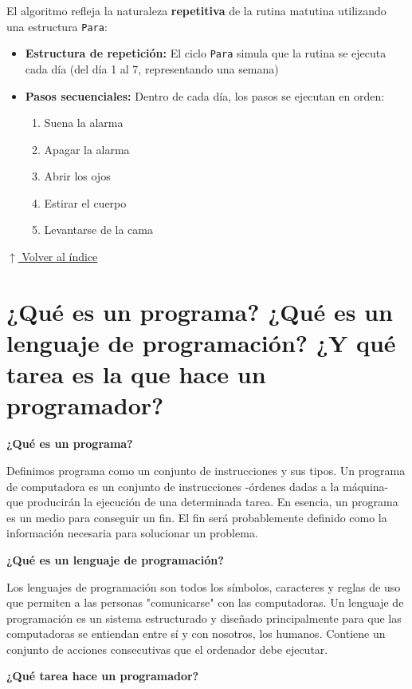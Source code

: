 \documentclass[12pt]{article}
\newcommand{\codigo}[1]{\texttt{\small #1}}
\newcommand{\volverindice}{%
    \vspace{1em}%
    \begin{flushright}%
        \hyperlink{indice}{\small $\uparrow$ Volver al índice}%
    \end{flushright}%
}
\begin{document}
El algoritmo refleja la naturaleza \textbf{repetitiva} de la rutina matutina utilizando una estructura \codigo{Para}:

\begin{itemize}
    \item \textbf{Estructura de repetición:} El ciclo \codigo{Para} simula que la rutina se ejecuta cada día (del día 1 al 7, representando una semana)
    \item \textbf{Pasos secuenciales:} Dentro de cada día, los pasos se ejecutan en orden:
    \begin{enumerate}
        \item Suena la alarma
        \item Apagar la alarma
        \item Abrir los ojos
        \item Estirar el cuerpo
        \item Levantarse de la cama
    \end{enumerate}
\end{itemize}

\volverindice
\newpage


\section{¿Qué es un programa? ¿Qué es un lenguaje de programación? ¿Y qué tarea es la que hace un programador?}

\textbf{¿Qué es un programa?}

Definimos programa como un conjunto de instrucciones y sus tipos. Un programa de computadora es un conjunto de instrucciones -órdenes dadas a la máquina- que producirán la ejecución de una determinada tarea. En esencia, un programa es un medio para conseguir un fin. El fin será probablemente definido como la información necesaria para solucionar un problema.

\textbf{¿Qué es un lenguaje de programación?}

Los lenguajes de programación son todos los símbolos, caracteres y reglas de uso que permiten a las personas "comunicarse" con las computadoras.
Un lenguaje de programación es un sistema estructurado y diseñado principalmente para que las computadoras se entiendan entre sí y con nosotros, los humanos. Contiene un conjunto de acciones consecutivas que el ordenador debe ejecutar.

\textbf{¿Qué tarea hace un programador?}
\end{document}
